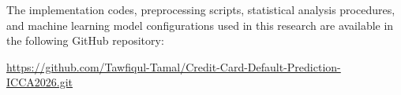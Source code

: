 \documentclass[sigconf]{acmart}
\begin{document}
The implementation codes, preprocessing scripts, statistical analysis procedures, and machine learning model configurations used in this research are available in the following GitHub repository:

\url{https://github.com/Tawfiqul-Tamal/Credit-Card-Default-Prediction-ICCA2026.git}




\balance


\end{document}
